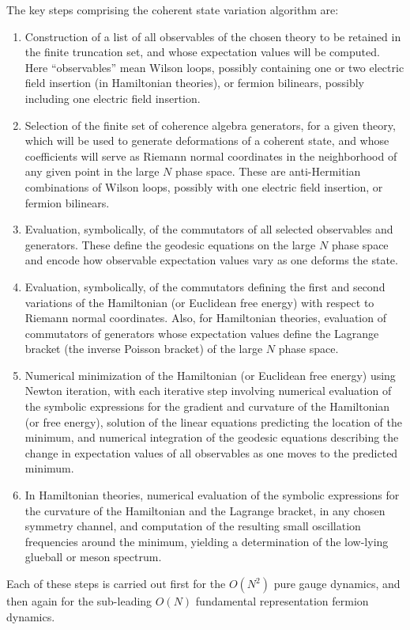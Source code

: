\documentclass [12pt]{article}
\begin{document}
The key steps comprising the coherent state variation algorithm
\cite {CSVAII} are:
\begin{enumerate}\advance\itemsep -4pt
\item
    Construction of a list of all observables of the chosen theory
    to be retained in the finite truncation set,
    and whose expectation values will be computed.
    Here ``observables'' mean Wilson loops, possibly containing one or
    two electric field insertion (in Hamiltonian theories),
    or fermion bilinears, possibly including one electric field insertion.
\item
    Selection of the finite set of coherence algebra generators, for a given theory,
    which will be used to generate deformations of a coherent state,
    and whose coefficients will serve as Riemann normal coordinates
    in the neighborhood of any given point
    in the large $N$ phase space.
    These are anti-Hermitian combinations of Wilson loops,
    possibly with one electric field insertion, or fermion bilinears.
\item
    Evaluation, symbolically, of the commutators of all selected observables
    and generators.  These define the geodesic equations
    on the large $N$ phase space and encode how observable expectation
    values vary as one deforms the state.
\item
    Evaluation, symbolically, of the commutators defining the first and second
    variations of the Hamiltonian (or Euclidean free energy) with respect
    to Riemann normal coordinates.
    Also, for Hamiltonian theories,
    evaluation of commutators of generators whose expectation values
    define the Lagrange bracket (the inverse Poisson bracket)
    of the large $N$ phase space.
\item
    Numerical minimization of the Hamiltonian (or Euclidean
    free energy) using Newton iteration, with each iterative step
    involving numerical evaluation of the symbolic expressions
    for the gradient and curvature of the Hamiltonian (or free energy),
    solution of the linear equations predicting the location of the minimum,
    and numerical integration of the geodesic equations describing
    the change in expectation values of all observables as one moves
    to the predicted minimum.
\item
    In Hamiltonian theories,
    numerical evaluation of the symbolic expressions for the curvature of the
    Hamiltonian and the Lagrange bracket, in any chosen symmetry channel,
    and computation of the resulting
    small oscillation frequencies around the minimum,
    yielding a determination of the
    low-lying glueball or meson spectrum.
\end{enumerate}
%
Each of these steps is carried out first for the $O(N^2)$ pure gauge dynamics,
and then again for the sub-leading $O(N)$ fundamental representation
fermion dynamics.
\end{document}
